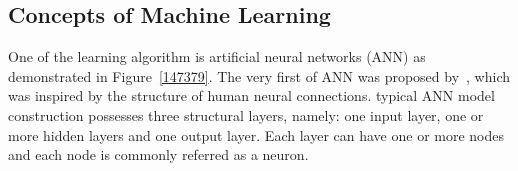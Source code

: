\subsection{Concepts of Machine Learning}
One of the learning algorithm is artificial neural networks (ANN) as demonstrated in Figure~\ref{147379}. The very first of ANN was proposed by~\citet{McCulloch_1943}, which was inspired by the structure of human neural connections. 
\A typical ANN model construction possesses three structural layers, namely: one input layer, one or more hidden layers and one output layer. Each layer can have one or more nodes and each node is commonly referred as a neuron.  